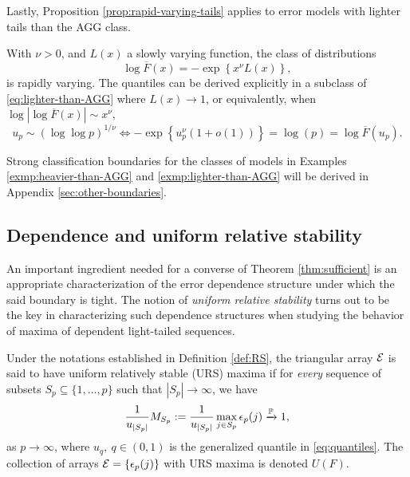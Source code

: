 Lastly, Proposition \ref{prop:rapid-varying-tails} applies to error models with lighter tails than the AGG class.

\begin{example} \label{exmp:lighter-than-AGG}
With $\nu>0$, and $L(x)$ a slowly varying function, the class of distributions
\begin{equation} \label{eq:lighter-than-AGG}
    \log{\overline{F}(x)} = - \exp{\left\{x^\nu L(x)\right\}},
\end{equation}
is rapidly varying.
The quantiles can be derived explicitly in a subclass of \eqref{eq:lighter-than-AGG} where $L(x)\to 1$, or equivalently, when $\log{|\log{\overline{F}(x)}|}\sim x^\nu$,
\begin{equation*}
    u_p \sim \left(\log \log{p}\right)^{1/\nu}
    \iff - \exp{\left\{u_p^\nu\left(1+o(1)\right)\right\}} = \log(p) = \log \overline{F}(u_p).
\end{equation*}
\end{example}
Strong classification boundaries for the classes of models in Examples \ref{exmp:heavier-than-AGG} and \ref{exmp:lighter-than-AGG} will be derived in Appendix \ref{sec:other-boundaries}.

\subsection{Dependence and uniform relative stability}
\label{subsec:URS}

An important ingredient needed for a converse of Theorem \ref{thm:sufficient} is an appropriate characterization of the error dependence structure under which the said boundary is tight.
The notion of \emph{uniform relative stability} turns out to be the key in characterizing such dependence structures when studying the behavior of maxima of dependent light-tailed sequences.

\begin{definition} \label{def:URS}
Under the notations established in Definition \ref{def:RS}, the triangular array ${\cal E}$ is said to have uniform relatively stable (URS) maxima if for \emph{every} sequence of subsets $S_p\subseteq\{1,\ldots,p\}$ such that $|S_p| \to \infty$, we have
\begin{equation} \label{eq:URS-condition}
    \frac{1}{u_{|S_p|}} M_{S_p} := \frac{1}{u_{|S_p|}} \max_{j\in S_p} \epsilon_p(j) \xrightarrow{\P} 1,
\end{equation}
as $p\to\infty$, where $u_q,\ q\in (0,1)$ is the generalized quantile in \eqref{eq:quantiles}.
The collection of arrays ${\cal E} = \{ \epsilon_p(j) \}$ with URS maxima is 
denoted $U(F)$.
\end{definition}

